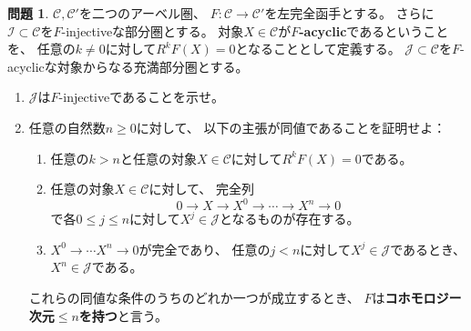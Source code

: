 \documentclass[uplatex,dvipdfmx]{jsarticle}
\theoremstyle{definition}
\newtheorem{prob}[prob]{問題}
\newcommand\mcC{\mathcal{C}}
\newcommand\mcI{\mathcal{I}}
\newcommand\mcJ{\mathcal{J}}
\begin{document}
\begin{prob}\label{1.19}
  \(\mcC,\mcC'\)を二つのアーベル圏、
  \(F:\mcC \to \mcC'\)を左完全函手とする。
  さらに\(\mcI\subset \mcC\)を\(F\)-injectiveな部分圏とする。
  対象\(X\in \mcC\)が\textbf{\(F\)-acyclic}であるということを、
  任意の\(k\neq 0\)に対して\(R^kF(X) = 0\)となることとして定義する。
  \(\mcJ\subset \mcC\)を\(F\)-acyclicな対象からなる充満部分圏とする。
  \begin{enumerate}
    \item \label{1.19.1}
    \(\mcJ\)は\(F\)-injectiveであることを示せ。
    \item \label{1.19.2}
    任意の自然数\(n\geq 0\)に対して、
    以下の主張が同値であることを証明せよ：
    \begin{enumerate}
      \item \label{1.19.2.1}
      任意の\(k > n\)と任意の対象\(X\in \mcC\)に対して\(R^kF(X) = 0\)である。
      \item \label{1.19.2.2}
      任意の対象\(X\in \mcC\)に対して、
      完全列
      \[
      0 \to X \to X^0 \to \cdots \to X^n \to 0
      \]
      で各\(0\leq j\leq n\)に対して\(X^j\in \mcJ\)となるものが存在する。
      \item \label{1.19.2.3}
      \(X^0\to \cdots X^n \to 0\)が完全であり、
      任意の\(j < n\)に対して\(X^j\in \mcJ\)であるとき、
      \(X^n\in \mcJ\)である。
    \end{enumerate}
    これらの同値な条件のうちのどれか一つが成立するとき、
    \(F\)は\textbf{コホモロジー次元\(\leq n\)を持つ}と言う。
  \end{enumerate}
\end{prob}
\end{document}
